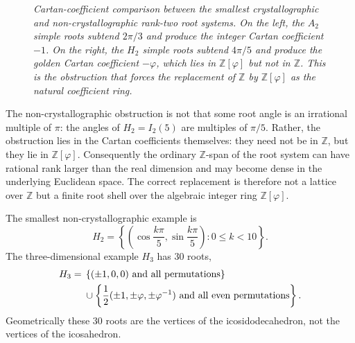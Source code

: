 \documentclass[12pt,oneside,english]{amsart}
\numberwithin{equation}{section}
\numberwithin{figure}{section}
\numberwithin{table}{section}
\theoremstyle{plain}
\theoremstyle{definition}
\theoremstyle{remark}
\newcommand{\ZZ}{\mathbb Z}
\newcommand{\Zphi}{\mathbb Z[\varphi]}
\begin{document}
\begin{figure}[htbp]
\caption{\emph{Cartan-coefficient comparison between the smallest crystallographic and non-crystallographic rank-two root systems. On the left, the $A_2$ simple roots subtend $2\pi/3$ and produce the integer Cartan coefficient $-1$. On the right, the $H_2$ simple roots subtend $4\pi/5$ and produce the golden Cartan coefficient $-\varphi$, which lies in $\Zphi$ but not in $\ZZ$. This is the obstruction that forces the replacement of $\ZZ$ by $\Zphi$ as the natural coefficient ring.}}
\label{fig:cartan-a2-vs-h2}
\end{figure}


The non-crystallographic obstruction is not that some root angle is an irrational multiple of \(\pi\): the angles of \(H_2=I_2(5)\) are multiples of \(\pi/5\). Rather, the obstruction lies in the Cartan coefficients themselves: they need not be in \(\ZZ\), but they lie in \(\Zphi\). Consequently the ordinary \(\ZZ\)-span of the root system can have rational rank larger than the real dimension and may become dense in the underlying Euclidean space. The correct replacement is therefore not a lattice over \(\ZZ\) but a finite root shell over the algebraic integer ring \(\Zphi\).

The smallest non-crystallographic example is
\begin{equation}
H_2=\left\{\left(\cos\frac{k\pi}{5},\sin\frac{k\pi}{5}\right):0\leq k<10\right\}.
\label{eq:h2-decagon}
\end{equation}
The three-dimensional example \(H_3\) has \(30\) roots,
\begin{align}
H_3={}&
\left\{(\pm1,0,0)\text{ and all permutations}\right\}
\notag\\
&\cup
\left\{\frac12(\pm1,\pm\varphi,\pm\varphi^{-1})\text{ and all even permutations}\right\}.
\label{eq:h3-roots}
\end{align}
Geometrically these \(30\) roots are the vertices of the icosidodecahedron, not the vertices of the icosahedron.
\end{document}
